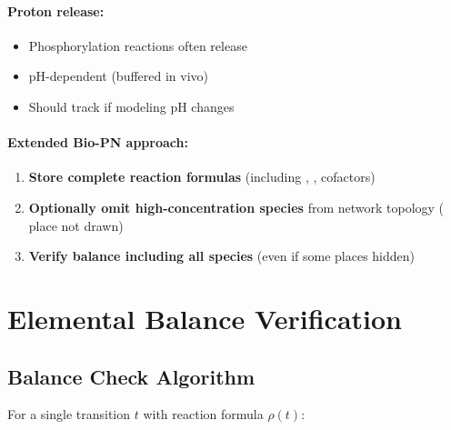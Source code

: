 \paragraph{Proton release:}
\begin{itemize}
    \item Phosphorylation reactions often release 
    \item pH-dependent (buffered in vivo)
    \item Should track if modeling pH changes
\end{itemize}

\paragraph{Extended Bio-PN approach:}
\begin{enumerate}
    \item \textbf{Store complete reaction formulas} (including , , cofactors)
    \item \textbf{Optionally omit high-concentration species} from network topology ( place not drawn)
    \item \textbf{Verify balance including all species} (even if some places hidden)
\end{enumerate}

\section{Elemental Balance Verification}
\label{sec:elemental-balance}

\subsection{Balance Check Algorithm}
\label{subsec:balance-check}

For a single transition $t$ with reaction formula $\rho(t)$:

